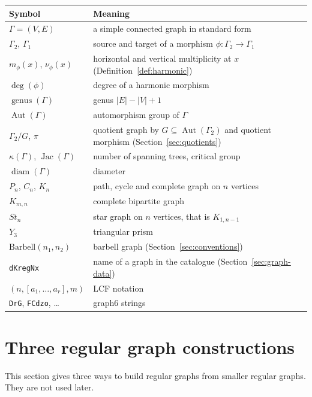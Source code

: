 \documentclass[12pt,letterpaper]{article}
\theoremstyle{definition}
\DeclareMathOperator{\Aut}{Aut}
\DeclareMathOperator{\genus}{genus}
\DeclareMathOperator{\Jac}{Jac}
\begin{document}
\begin{center}
\renewcommand{\arraystretch}{1.15}
\begin{tabular}{p{}p{}}
\hline
Symbol & Meaning \\
\hline
$\Gamma=(V,E)$ & a simple connected graph in standard form \\
$\Gamma_2$, $\Gamma_1$ & source and target of a morphism $\phi:\Gamma_2\to\Gamma_1$ \\
$m_\phi(x)$, $\nu_\phi(x)$ & horizontal and vertical multiplicity at $x$ (Definition~\ref{def:harmonic}) \\
$\deg(\phi)$ & degree of a harmonic morphism \\
$\genus(\Gamma)$ & genus $|E|-|V|+1$ \\
$\Aut(\Gamma)$ & automorphism group of $\Gamma$ \\
$\Gamma_2/G$, $\pi$ & quotient graph by $G\subseteq\Aut(\Gamma_2)$ and quotient morphism (Section~\ref{sec:quotients}) \\
$\kappa(\Gamma)$, $\Jac(\Gamma)$ & number of spanning trees, critical group \\
$\operatorname{diam}(\Gamma)$ & diameter \\
$P_n$, $C_n$, $K_n$ & path, cycle and complete graph on $n$ vertices \\
$K_{m,n}$ & complete bipartite graph \\
$St_n$ & star graph on $n$ vertices, that is $K_{1,n-1}$ \\
$Y_3$ & triangular prism \\
$\mathrm{Barbell}(n_1,n_2)$ & barbell graph (Section~\ref{sec:conventions}) \\
{\tt dKregNx} & name of a graph in the catalogue (Section~\ref{sec:graph-data}) \\
$(n,[a_1,\dots,a_r],m)$ & LCF notation \\
{\tt DrG}, {\tt FCdzo}, \dots & graph6 strings \cite{Mc26} \\
\hline
\end{tabular}
\end{center}

\section{Three regular graph constructions}
\label{sec:constructions}

This section gives three ways to build regular graphs from smaller regular
graphs. They are not used later.
\end{document}
